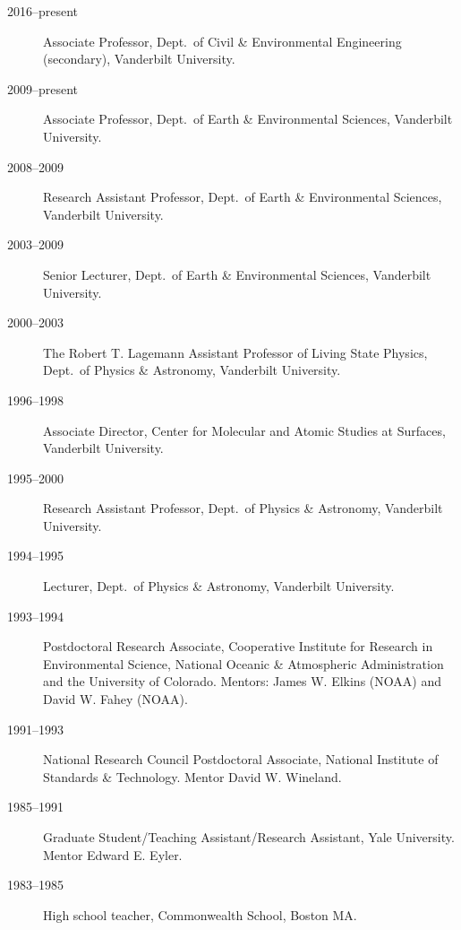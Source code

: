 \begin{description}
\item[2016--present] Associate Professor, Dept.\ of Civil \& Environmental Engineering (secondary), Vanderbilt University.
\item[2009--present] Associate Professor, Dept.\ of Earth \& Environmental Sciences, Vanderbilt University.
\item[2008--2009] Research Assistant Professor, Dept.\ of Earth \& Environmental Sciences, Vanderbilt University.
\item[2003--2009] Senior Lecturer, Dept.\ of Earth \& Environmental Sciences, Vanderbilt University.
\item[2000--2003] The Robert T. Lagemann Assistant Professor of Living State Physics, Dept.\ of Physics \& Astronomy, Vanderbilt University.
\item[1996--1998] Associate Director, Center for Molecular and Atomic Studies at Surfaces, Vanderbilt University.
\item[1995--2000] Research Assistant Professor, Dept.\ of Physics \& Astronomy, Vanderbilt University.
\item[1994--1995] Lecturer, Dept.\ of Physics \& Astronomy, Vanderbilt University.
\item[1993--1994] Postdoctoral Research Associate, Cooperative Institute for Research in Environmental Science, National Oceanic \& Atmospheric Administration and the University of Colorado. Mentors: James W. Elkins (NOAA) and David W. Fahey (NOAA).
\item[1991--1993] National Research Council Postdoctoral Associate, National Institute of Standards \& Technology. Mentor David W. Wineland.
\item[1985--1991] Graduate Student/Teaching Assistant/Research Assistant, Yale University. Mentor Edward E. Eyler.
\item[1983--1985] High school teacher, Commonwealth School, Boston MA.
\end{description}
